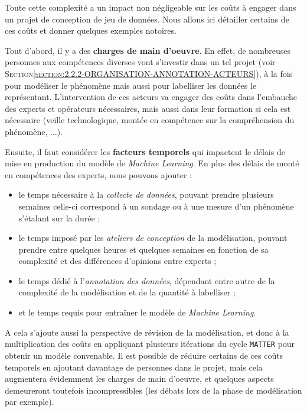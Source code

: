 			Toute cette complexité a un impact non négligeable sur les coûts à engager dans un projet de conception de jeu de données.
			Nous allons ici détailler certains de ces coûts et donner quelques exemples notoires.
			
			Tout d'abord, il y a des \textbf{charges de main d'oeuvre}.
			En effet, de nombreuses personnes aux compétences diverses vont s'investir dans un tel projet (voir \textsc{Section\ref{section:2.2.2-ORGANISATION-ANNOTATION-ACTEURS}}), à la fois pour modéliser le phénomène mais aussi pour labelliser les données le représentant.
			L'intervention de ces acteurs va engager des coûts dans l'embauche des experts et opérateurs nécessaires, mais aussi dans leur formation si cela est nécessaire (veille technologique, montée en compétence sur la compréhension du phénomène, ...).
			
			Ensuite, il faut considérer les \textbf{facteurs temporels} qui impactent le délais de mise en production du modèle de \textit{Machine Learning}.
			En plus des délais de monté en compétences des experts, nous pouvons ajouter :
			\begin{itemize}
				\item le temps nécessaire à la \textit{collecte de données}, pouvant prendre plusieurs semaines celle-ci correspond à un sondage ou à une mesure d'un phénomène s'étalant sur la durée ;
				\item le temps imposé par les \textit{ateliers de conception} de la modélisation, pouvant prendre entre quelques heures et quelques semaines en fonction de sa complexité et des différences d'opinions entre experts ;
				\item le temps dédié à l'\textit{annotation des données}, dépendant entre autre de la complexité de la modélisation et de la quantité à labelliser ;
				\item et le temps requis pour entraîner le modèle de \textit{Machine Learning}.
			\end{itemize}
			A cela s'ajoute aussi la perspective de révision de la modélisation, et donc à la multiplication des coûts en appliquant plusieurs itérations du cycle \texttt{MATTER} pour obtenir un modèle convenable.
			Il est possible de réduire certains de ces coûts temporels en ajoutant davantage de personnes dans le projet, mais cela augmentera évidemment les charges de main d'oeuvre, et quelques aspects demeureront toutefois incompressibles (les débats lors de la phase de modélisation par exemple).
			
